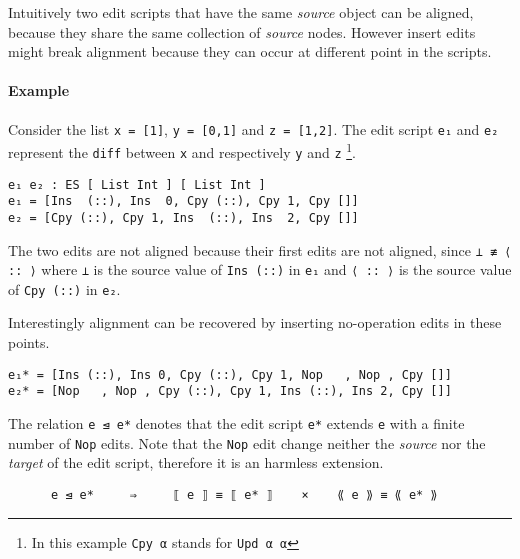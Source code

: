 \documentclass[preprint]{sigplanconf}
\begin{document}
        Intuitively two edit scripts that have the same \emph{source}
        object can be aligned, because they share the same collection
        of \emph{source} nodes.
        However insert edits might break alignment because they can
        occur at different point in the scripts.

        \paragraph{Example}
        Consider the list \texttt{x = [1]}, \texttt{y = [0,1]} and \texttt{z = [1,2]}.
        The edit script \texttt{e₁} and \texttt{e₂} represent the \texttt{diff} between \texttt{x} and
        respectively \texttt{y} and \texttt{z} \footnote{In this example \texttt{Cpy α} stands for \texttt{Upd α α}}.

\begin{verbatim}
e₁ e₂ : ES [ List Int ] [ List Int ]
e₁ = [Ins  (::), Ins  0, Cpy (::), Cpy 1, Cpy []]
e₂ = [Cpy (::), Cpy 1, Ins  (::), Ins  2, Cpy []] 
\end{verbatim}       

        The two edits are not aligned because their first edits are not aligned, since \texttt{⊥ ≢ ⟨ :: ⟩}
        where \texttt{⊥} is the source value of \texttt{Ins (::)} in \texttt{e₁} and \texttt{⟨ :: ⟩} is
        the source value of \texttt{Cpy (::)} in \texttt{e₂}.

        Interestingly alignment can be recovered by inserting no-operation edits in 
        these points. 
\begin{verbatim}
e₁* = [Ins (::), Ins 0, Cpy (::), Cpy 1, Nop   , Nop , Cpy []]
e₂* = [Nop   , Nop , Cpy (::), Cpy 1, Ins (::), Ins 2, Cpy []] 
\end{verbatim}
        The relation \texttt{e ⊴ e*} denotes that the edit script \texttt{e*}
        extends \texttt{e} with a finite number of \texttt{Nop} edits.
        Note that the \texttt{Nop} edit change neither the \emph{source} nor 
        the \emph{target} of the edit script, therefore it is an harmless 
        extension.
        
\begin{verbatim}
      e ⊴ e*     ⇒     ⟦ e ⟧ ≡ ⟦ e* ⟧    ×    ⟪ e ⟫ ≡ ⟪ e* ⟫ 
\end{verbatim}
\end{document}
